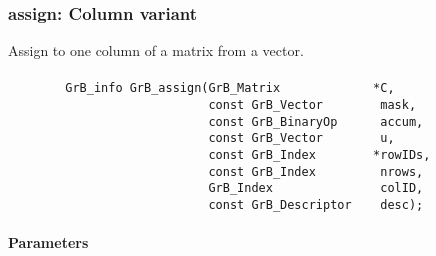 \subsubsection{{\sf assign}: Column variant}

Assign to one column of a matrix from a vector.  



\paragraph{\syntax}

\begin{verbatim}
        GrB_info GrB_assign(GrB_Matrix             *C,
                            const GrB_Vector        mask,
                            const GrB_BinaryOp      accum,
                            const GrB_Vector        u,
                            const GrB_Index        *rowIDs,
                            const GrB_Index         nrows,
                            GrB_Index               colID,
                            const GrB_Descriptor    desc); 
\end{verbatim}

\paragraph{Parameters}

